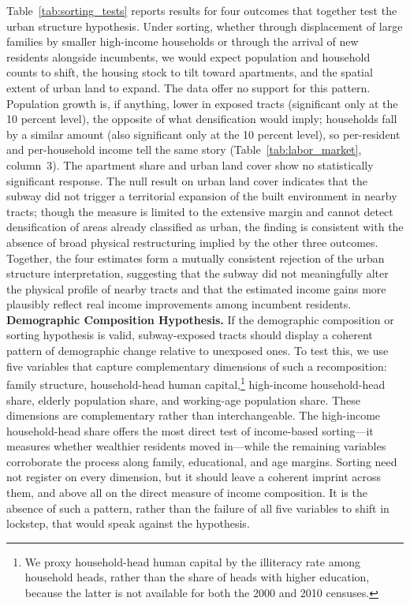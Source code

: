 Table~\ref{tab:sorting_tests} reports results for four outcomes that together test the urban structure hypothesis. Under sorting, whether through displacement of large families by smaller high-income households or through the arrival of new residents alongside incumbents, we would expect population and household counts to shift, the housing stock to tilt toward apartments, and the spatial extent of urban land to expand. The data offer no support for this pattern. Population growth is, if anything, lower in exposed tracts (significant only at the 10 percent level), the opposite of what densification would imply; households fall by a similar amount (also significant only at the 10 percent level), so per-resident and per-household income tell the same story (Table~\ref{tab:labor_market}, column~3). The apartment share and urban land cover show no statistically significant response. The null result on urban land cover indicates that the subway did not trigger a territorial expansion of the built environment in nearby tracts; though the measure is limited to the extensive margin and cannot detect densification of areas already classified as urban, the finding is consistent with the absence of broad physical restructuring implied by the other three outcomes. Together, the four estimates form a mutually consistent rejection of the urban structure interpretation, suggesting that the subway did not meaningfully alter the physical profile of nearby tracts and that the estimated income gains more plausibly reflect real income improvements among incumbent residents.\\

\noindent
\textbf{Demographic Composition Hypothesis.} If the demographic composition or sorting hypothesis is valid, subway-exposed tracts should display a coherent pattern of demographic change relative to unexposed ones. To test this, we use five variables that capture complementary dimensions of such a recomposition: family structure, household-head human capital,\footnote{We proxy household-head human capital by the illiteracy rate among household heads, rather than the share of heads with higher education, because the latter is not available for both the 2000 and 2010 censuses.} high-income household-head share, elderly population share, and working-age population share. These dimensions are complementary rather than interchangeable. The high-income household-head share offers the most direct test of income-based sorting---it measures whether wealthier residents moved in---while the remaining variables corroborate the process along family, educational, and age margins. Sorting need not register on every dimension, but it should leave a coherent imprint across them, and above all on the direct measure of income composition. It is the absence of such a pattern, rather than the failure of all five variables to shift in lockstep, that would speak against the hypothesis.

